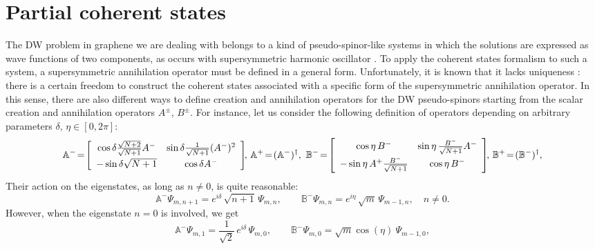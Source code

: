 \documentclass[aps,showpacs,showkeys]{revtex4}
\begin{document}
\section{Partial coherent states}\label{sec3}
The DW problem in graphene we are dealing with belongs to a kind of pseudo-spinor-like systems in which the solutions are expressed as wave functions of two components, as occurs with supersymmetric harmonic oscillator \cite{w81}. To apply the coherent states formalism to such a system, a supersymmetric annihilation operator must be defined in a general form. Unfortunately, it is known that it lacks uniqueness \cite{az86,bh93,kz13,df17}: there is a certain freedom to construct the coherent states associated with a specific form of the supersymmetric annihilation operator. In this sense, there are also different ways to define creation and annihilation operators for the DW pseudo-spinors starting from the scalar creation and annihilation operators $A^\pm$, $B^\pm$. For instance, let us consider the following definition of operators depending on arbitrary parameters $\delta,\,\eta\in[0,2\pi]$:
	\begin{equation}
	\mathbb{A}^-\! =\!\left[\begin{array}{c c}
	\cos\delta \frac{\sqrt{N+2}}{\sqrt{N+1}}A^- & \sin\delta \frac{1}{\sqrt{N+1}}(A^-)^2 \\ [1ex]
	-\sin\delta \sqrt{N+1} & \cos\delta A^-
	\end{array}\right]\!\!,\,   \mathbb{A}^+ \!=\! (\mathbb{A}^-)^\dagger, \label{41a}
	\ 
	\mathbb{B}^- \!=\!\left[\begin{array}{c c}
	\cos\eta\, B^- & \sin\eta\,\frac{B^-}{\sqrt{N+1}}A^- \\ [1ex]
	-\sin\eta\, A^+\frac{B^-}{\sqrt{N+1}} & \cos\eta\, B^-
	\end{array}\right]\!\!,\,  \mathbb{B}^+ \!=\!(\mathbb{B}^-)^\dagger,  
	\end{equation}
Their action on the eigenstates, as long as $n\neq0$, is quite reasonable:
\begin{equation}\label{45a}
 \mathbb{A}^{-}\Psi_{m,n+1}=e^{i\delta}\, \sqrt{n+1}\, \Psi_{m,n}, \qquad 
\mathbb{B}^{-}\Psi_{m,n}=e^{i\eta}\, \sqrt{m}\, \Psi_{m-1,n}, \quad n\neq0.
\end{equation}
However, when the eigenstate $n=0$ is involved, we get
\begin{equation*}
\mathbb{A}^{-}\Psi_{m,1}=\frac{1}{\sqrt{2}}\, e^{i\delta}\, \Psi_{m,0}, \qquad \mathbb{B}^{-}\Psi_{m,0}=\sqrt{m}\cos(\eta)\ \Psi_{m-1,0},
\end{equation*}
\end{document}
